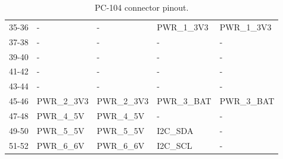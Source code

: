 \begin{table}[!h]
\begin{tabular}{cllll}
        35-36              & -                & -                & PWR\_1\_3V3   & PWR\_1\_3V3   \\
        37-38              & -                & -                & -             & -             \\
        39-40              & -                & -                & -             & -             \\
        41-42              & -                & -                & -             & -             \\
        43-44              & -                & -                & -             & -             \\
        45-46              & PWR\_2\_3V3      & PWR\_2\_3V3      & PWR\_3\_BAT   & PWR\_3\_BAT   \\
        47-48              & PWR\_4\_5V       & PWR\_4\_5V       & -             & -             \\
        49-50              & PWR\_5\_5V       & PWR\_5\_5V       & I2C\_SDA      & -             \\
        51-52              & PWR\_6\_6V       & PWR\_6\_6V       & I2C\_SCL      & -             \\
        \bottomrule[1.5pt]
    \end{tabular}
    \caption{PC-104 connector pinout.}
    \label{tab:pc104-pins}
\end{table}

